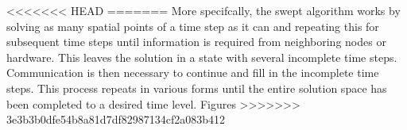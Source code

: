 \documentclass[mca,article,submit,moreauthors,pdftex]{Definitions/mdpi}
\newcommand{\revised}[2]{{\sloppy\cbcolor{#2}\textcolor{#2}{\cbstart {#1} \cbend}}}  %
\begin{document}





<<<<<<< HEAD
=======
More specifcally, the swept algorithm works by solving as many spatial points of a time step as it can and repeating this for subsequent time steps until information is required from neighboring nodes or hardware. This leaves the solution in a state with several incomplete time steps. Communication is then necessary to continue and fill in the incomplete time steps. This process repeats in various forms until the entire solution space has been completed to a desired time level. Figures 
>>>>>>> 3e3b3b0dfe54b8a81d7df82987134cf2a083b412
\end{document}
